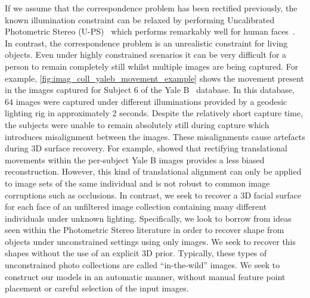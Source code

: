 If we assume that the correspondence problem has been rectified previously, 
the known illumination constraint can be relaxed by performing
Uncalibrated Photometric Stereo (U-PS)~\cite{hayakawa1994photometric,%
basri2007photometric} which performs remarkably well for
human faces~\cite{KemelmacherShlizerman:2013iv,kemelmacher2011face,%
kemelmacher2012collection}. In contrast, the correspondence problem is an
unrealistic constraint for living objects. Even under highly constrained
scenarios it can be very difficult for a person to remain completely still
whilst multiple images are being captured.
For example, \cref{fig:imag_coll_yaleb_movement_example} shows the movement
present in the images captured for Subject 6 of the
Yale B~\cite{georghiades2001fromfew} database. In this database, $64$ images
were captured under different illuminations provided by a geodesic lighting rig in
approximately 2 seconds. Despite the relatively short capture time, the subjects
were unable to remain absolutely still during capture which introduces
misalignment between the images. These misalignments cause artefacts
during 3D surface recovery.
For example, \citet{harrison2012translational} showed that rectifying
translational movements within the per-subject Yale B images provides a less
biased reconstruction. However, this kind of translational alignment can only
be applied to image sets of the same individual and is not robust to common
image corruptions such as occlusions. In contrast, we seek to recover a 3D
facial surface for each face of an unfiltered image collection containing
many different individuals under unknown lighting.
Specifically, we look to borrow from ideas seen within the Photometric Stereo
literature in order to recover shape from objects under unconstrained settings
using only images. We seek to recover this shapes without the use of an explicit 
3D prior. Typically, these types of unconstrained
photo collections are called ``in-the-wild'' images. We seek to construct our 
models in an automatic manner, without manual feature point placement or 
careful selection of the input images.
